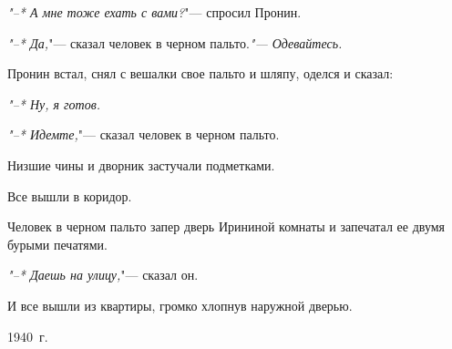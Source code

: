\textsl{"--* А мне тоже ехать с  вами?}"---   спросил
Пронин.

\textsl{"--* Да,}"---   сказал человек в черном пальто.\textsl{"--- Одевайтесь.}

    Пронин встал,  снял с вешалки свое 
    пальто и шляпу, оделся и сказал:
    
\textsl{"--* Ну, я готов.}
    
\textsl{"--* Идемте,}"---   сказал  человек  в черном
пальто.

    Низшие чины и дворник застучали 
    подметками.
     
    Все вышли в коридор.
    
    Человек  в  черном  пальто  запер дверь
Ирининой комнаты и запечатал ее двумя бурыми
печатями.

\textsl{"--* Даешь на улицу,}"---  сказал он.
    
    И все вышли из квартиры, громко хлопнув
наружной дверью.

\begin{flushright}
    1940~г.
\end{flushright}